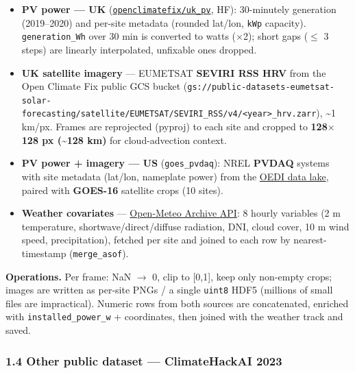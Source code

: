 \documentclass[
  9pt,
]{article}
\providecommand{\tightlist}{%
  \setlength{\itemsep}{0pt}\setlength{\parskip}{0pt}}
\begin{document}
\begin{itemize}
\tightlist
\item
  \textbf{PV power --- UK}
  (\href{https://huggingface.co/datasets/openclimatefix/uk_pv}{\texttt{openclimatefix/uk\_\allowbreak{}pv}},
  HF): 30-minutely generation (2019--2020) and per-site metadata
  (rounded lat/lon, \texttt{kWp} capacity). \texttt{generation\_\allowbreak{}Wh} over
  30 min is converted to watts (\(\times\)2); short gaps (\(\leq\) 3 steps) are linearly
  interpolated, unfixable ones dropped.
\item
  \textbf{UK satellite imagery} --- EUMETSAT \textbf{SEVIRI RSS HRV}
  from the Open Climate Fix public GCS bucket
  (\texttt{gs://public-datasets-eumetsat-solar-forecasting/satellite/EUMETSAT/SEVIRI\_\allowbreak{}RSS/v4/\textless{}year\textgreater{}\_\allowbreak{}hrv.zarr}),
  \textasciitilde1 km/px. Frames are reprojected (pyproj) to each site
  and cropped to \textbf{128\(\times\)128 px (\textasciitilde128 km)} for
  cloud-advection context.
\item
  \textbf{PV power + imagery --- US} (\texttt{goes\_\allowbreak{}pvdaq}): NREL
  \textbf{PVDAQ} systems with site metadata (lat/lon, nameplate power)
  from the \href{https://oedi-data-lake.s3.amazonaws.com/pvdaq/}{OEDI
  data lake}, paired with \textbf{GOES-16} satellite crops (10 sites).
\item
  \textbf{Weather covariates} ---
  \href{https://open-meteo.com/en/docs/historical-weather-api}{Open-Meteo
  Archive API}: 8 hourly variables (2 m temperature,
  shortwave/direct/diffuse radiation, DNI, cloud cover, 10 m wind speed,
  precipitation), fetched per site and joined to each row by
  nearest-timestamp (\texttt{merge\_\allowbreak{}asof}).
\end{itemize}

\textbf{Operations.} Per frame: NaN \(\rightarrow\) 0, clip to {[}0,1{]}, keep only
non-empty crops; images are written as per-site PNGs / a single
\texttt{uint8} HDF5 (millions of small files are impractical). Numeric
rows from both sources are concatenated, enriched with
\texttt{installed\_\allowbreak{}power\_\allowbreak{}w} + coordinates, then joined with the weather
track and saved.

\subsubsection{1.4 Other public dataset --- ClimateHackAI
2023}\label{other-public-dataset-climatehackai-2023}
\end{document}
